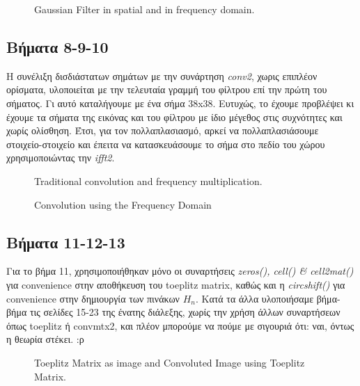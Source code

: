 \documentclass[11pt]{scrartcl} %
\begin{document}
\begin{figure}[h]
    \centering
    \caption{Gaussian Filter in spatial and in frequency domain.}
\end{figure}


\subsection*{Βήματα 8-9-10}

Η συνέλιξη δισδιάστατων σημάτων με την συνάρτηση \textit{conv2}, χωρις επιπλέον ορίσματα, υλοποιείται με την τελευταία
γραμμή του φίλτρου επί την πρώτη του σήματος. Γι αυτό καταλήγουμε με ένα σήμα 38x38. Ευτυχώς, το έχουμε προβλέψει κι έχουμε
τα σήματα της εικόνας και του φίλτρου με ίδιο μέγεθος στις συχνότητες και χωρίς ολίσθηση. Έτσι, για τον πολλαπλασιασμό, αρκεί να
πολλαπλασιάσουμε στοιχείο-στοιχείο και έπειτα να κατασκευάσουμε το σήμα στο πεδίο του χώρου χρησιμοποιώντας την \textit{ifft2}.
\begin{figure}[h]
    \centering
    \caption{Traditional convolution and frequency multiplication.}
\end{figure}

\begin{figure}[h]
    \centering
    \caption{Convolution using the Frequency Domain}
\end{figure}

\subsection*{Βήματα 11-12-13}

Για το βήμα 11, χρησιμοποιήθηκαν μόνο οι συναρτήσεις \textit{zeros(), cell() \& cell2mat()} για convenience στην αποθήκευση
του toeplitz matrix, καθώς και η \textit{circshift()} για convenience στην δημιουργία των πινάκων $H_n$. Κατά τα άλλα υλοποιήσαμε
βήμα-βήμα τις σελίδες 15-23 της ένατης διάλεξης, χωρίς την χρήση άλλων συναρτήσεων όπως toeplitz ή convmtx2, και πλέον μπορούμε
να πούμε με σιγουριά ότι: ναι, όντως η θεωρία στέκει. :ρ


\begin{figure}[h]
    \centering
    \caption{Toeplitz Matrix as image and Convoluted Image using Toeplitz Matrix.}
\end{figure}
\end{document}
